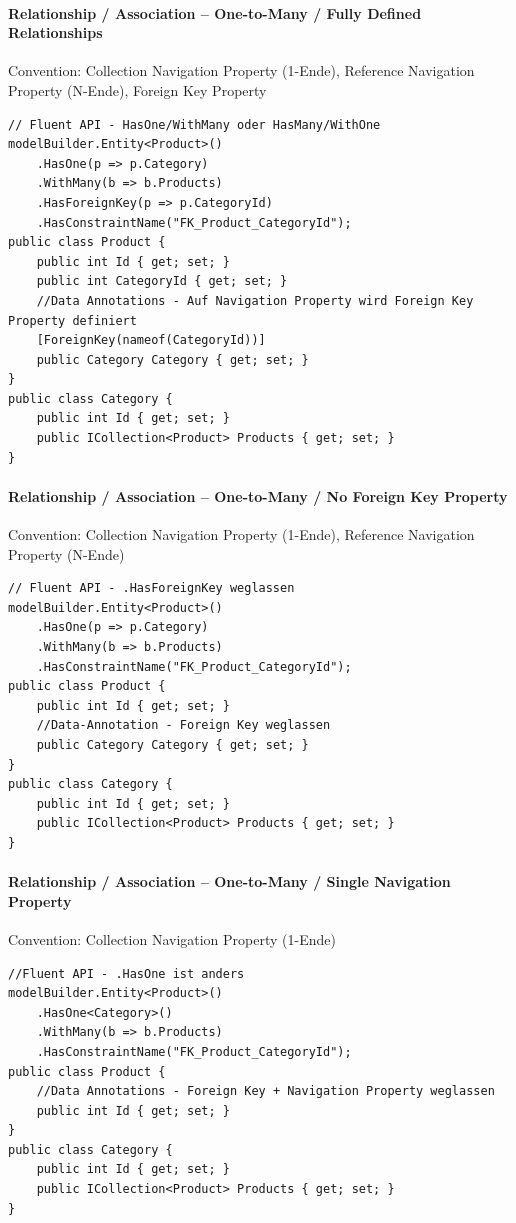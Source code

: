 \documentclass[
a4paper,
oneside,
10pt,
fleqn,
headsepline,
toc=listofnumbered, 
bibliography=totocnumbered]{scrartcl}
\begin{document}
\paragraph{Relationship / Association – One-to-Many / Fully Defined Relationships}
Convention: Collection Navigation Property (1-Ende), Reference Navigation Property (N-Ende), Foreign Key Property
\begin{lstlisting}
// Fluent API - HasOne/WithMany oder HasMany/WithOne
modelBuilder.Entity<Product>()
    .HasOne(p => p.Category)                            
    .WithMany(b => b.Products)
    .HasForeignKey(p => p.CategoryId)
    .HasConstraintName("FK_Product_CategoryId");
public class Product {
    public int Id { get; set; }
    public int CategoryId { get; set; }
    //Data Annotations - Auf Navigation Property wird Foreign Key Property definiert
    [ForeignKey(nameof(CategoryId))]                        
    public Category Category { get; set; }
}
public class Category {
    public int Id { get; set; }
    public ICollection<Product> Products { get; set; }
}
\end{lstlisting}

\paragraph{Relationship / Association – One-to-Many / No Foreign Key Property}
Convention: Collection Navigation Property (1-Ende), Reference Navigation Property (N-Ende)
\begin{lstlisting}
// Fluent API - .HasForeignKey weglassen
modelBuilder.Entity<Product>()
    .HasOne(p => p.Category)
    .WithMany(b => b.Products)                          
    .HasConstraintName("FK_Product_CategoryId");
public class Product {
    public int Id { get; set; }
    //Data-Annotation - Foreign Key weglassen
    public Category Category { get; set; }              
}
public class Category {
    public int Id { get; set; }
    public ICollection<Product> Products { get; set; }
}
\end{lstlisting}

\paragraph{Relationship / Association – One-to-Many / Single Navigation Property} Convention: Collection Navigation Property (1-Ende)
\begin{lstlisting}
//Fluent API - .HasOne ist anders
modelBuilder.Entity<Product>()
    .HasOne<Category>()
    .WithMany(b => b.Products)
    .HasConstraintName("FK_Product_CategoryId");
public class Product {
    //Data Annotations - Foreign Key + Navigation Property weglassen
    public int Id { get; set; }                         
}
public class Category {
    public int Id { get; set; }
    public ICollection<Product> Products { get; set; }
}
\end{lstlisting}
\end{document}
